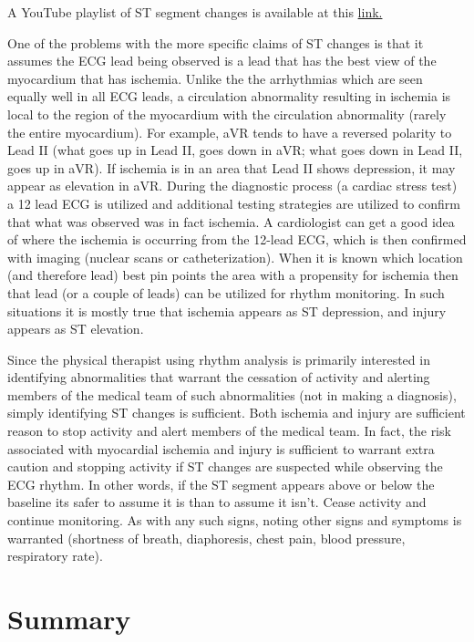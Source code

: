 A YouTube playlist of ST segment changes is available at this \href{https://www.youtube.com/playlist?list=PLNN6HI4OXQmyHL-CDiLqrBSkv6E1Vk0cS}{link.}

One of the problems with the more specific claims of ST changes is that it assumes the ECG lead being observed is a lead that has the best view of the myocardium that has ischemia. Unlike the the arrhythmias which are seen equally well in all ECG leads, a circulation abnormality resulting in ischemia is local to the region of the myocardium with the circulation abnormality (rarely the entire myocardium). For example, aVR tends to have a reversed polarity to Lead II (what goes up in Lead II, goes down in aVR; what goes down in Lead II, goes up in aVR). If ischemia is in an area that Lead II shows depression, it may appear as elevation in aVR. During the diagnostic process (a cardiac stress test) a 12 lead ECG is utilized and additional testing strategies are utilized to confirm that what was observed was in fact ischemia. A cardiologist can get a good idea of where the ischemia is occurring from the 12-lead ECG, which is then confirmed with imaging (nuclear scans or catheterization). When it is known which location (and therefore lead) best pin points the area with a propensity for ischemia then that lead (or a couple of leads) can be utilized for rhythm monitoring. In such situations it is mostly true that ischemia appears as ST depression, and injury appears as ST elevation.

Since the physical therapist using rhythm analysis is primarily interested in identifying abnormalities that warrant the cessation of activity and alerting members of the medical team of such abnormalities (not in making a diagnosis), simply identifying ST changes is sufficient. Both ischemia and injury are sufficient reason to stop activity and alert members of the medical team. In fact, the risk associated with myocardial ischemia and injury is sufficient to warrant extra caution and stopping activity if ST changes are suspected while observing the ECG rhythm. In other words, if the ST segment appears above or below the baseline its safer to assume it is than to assume it isn't. Cease activity and continue monitoring. As with any such signs, noting other signs and symptoms is warranted (shortness of breath, diaphoresis, chest pain, blood pressure, respiratory rate).

\section{Summary}

